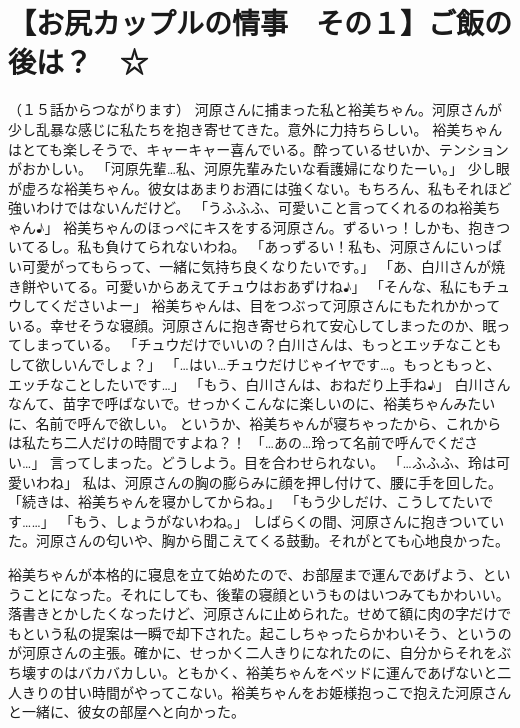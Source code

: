 \section{【お尻カップルの情事　その１】ご飯の後は？　☆}
（１５話からつながります）
河原さんに捕まった私と裕美ちゃん。河原さんが少し乱暴な感じに私たちを抱き寄せてきた。意外に力持ちらしい。
裕美ちゃんはとても楽しそうで、キャーキャー喜んでいる。酔っているせいか、テンションがおかしい。
「河原先輩…私、河原先輩みたいな看護婦になりたーい。」
少し眼が虚ろな裕美ちゃん。彼女はあまりお酒には強くない。もちろん、私もそれほど強いわけではないんだけど。
「うふふふ、可愛いこと言ってくれるのね裕美ちゃん♪」
裕美ちゃんのほっぺにキスをする河原さん。ずるいっ！しかも、抱きついてるし。私も負けてられないわね。
「あっずるい！私も、河原さんにいっぱい可愛がってもらって、一緒に気持ち良くなりたいです。」
「あ、白川さんが焼き餅やいてる。可愛いからあえてチュウはおあずけね♪」
「そんな、私にもチュウしてくださいよー」
裕美ちゃんは、目をつぶって河原さんにもたれかかっている。幸せそうな寝顔。河原さんに抱き寄せられて安心してしまったのか、眠ってしまっている。
「チュウだけでいいの？白川さんは、もっとエッチなこともして欲しいんでしょ？」
「…はい…チュウだけじゃイヤです…。もっともっと、エッチなことしたいです…」
「もう、白川さんは、おねだり上手ね♪」
白川さんなんて、苗字で呼ばないで。せっかくこんなに楽しいのに、裕美ちゃんみたいに、名前で呼んで欲しい。
というか、裕美ちゃんが寝ちゃったから、これからは私たち二人だけの時間ですよね？！
「…あの…玲って名前で呼んでください…」
言ってしまった。どうしよう。目を合わせられない。
「…ふふふ、玲は可愛いわね」
私は、河原さんの胸の膨らみに顔を押し付けて、腰に手を回した。
「続きは、裕美ちゃんを寝かしてからね。」
「もう少しだけ、こうしてたいです……」
「もう、しょうがないわね。」
しばらくの間、河原さんに抱きついていた。河原さんの匂いや、胸から聞こえてくる鼓動。それがとても心地良かった。


裕美ちゃんが本格的に寝息を立て始めたので、お部屋まで運んであげよう、ということになった。それにしても、後輩の寝顔というものはいつみてもかわいい。
落書きとかしたくなったけど、河原さんに止められた。せめて額に肉の字だけでもという私の提案は一瞬で却下された。起こしちゃったらかわいそう、というのが河原さんの主張。確かに、せっかく二人きりになれたのに、自分からそれをぶち壊すのはバカバカしい。ともかく、裕美ちゃんをベッドに運んであげないと二人きりの甘い時間がやってこない。裕美ちゃんをお姫様抱っこで抱えた河原さんと一緒に、彼女の部屋へと向かった。

